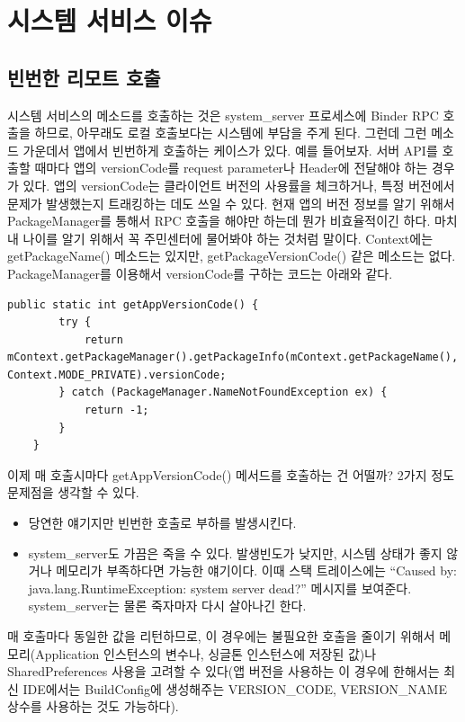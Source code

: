 \section{시스템 서비스 이슈}
\subsection{빈번한 리모트 호출}
시스템 서비스의 메소드를 호출하는 것은 system\_server 프로세스에 Binder RPC 호출을 하므로, 아무래도 로컬 호출보다는 시스템에 부담을 주게 된다.
그런데 그런 메소드 가운데서 앱에서 빈번하게 호출하는 케이스가 있다.
예를 들어보자. 서버 API를 호출할 때마다 앱의 versionCode를 request parameter나 Header에 전달해야 하는 경우가 있다.  앱의 versionCode는  클라이언트 버전의 사용률을 체크하거나, 특정 버전에서 문제가 발생했는지 트래킹하는 데도 쓰일 수 있다.
현재 앱의 버전 정보를 알기 위해서 PackageManager를 통해서 RPC 호출을 해야만 하는데 뭔가 비효율적이긴 하다. 
마치 내 나이를 알기 위해서 꼭 주민센터에 물어봐야 하는 것처럼 말이다. 
Context에는 getPackageName() 메소드는 있지만, getPackageVersionCode() 같은 메소드는 없다.\\

PackageManager를 이용해서 versionCode를 구하는 코드는 아래와 같다.
\begin{lstlisting}[frame=single]
	public static int getAppVersionCode() {
		try {
			return mContext.getPackageManager().getPackageInfo(mContext.getPackageName(), Context.MODE_PRIVATE).versionCode;
		} catch (PackageManager.NameNotFoundException ex) {
			return -1;
		}
	}
\end{lstlisting}

이제 매 호출시마다 getAppVersionCode() 메서드를 호출하는 건 어떨까?
2가지 정도 문제점을 생각할 수 있다.
\begin{itemize}
\item 당연한 얘기지만 빈번한 호출로 부하를 발생시킨다.
\item system\_server도  가끔은 죽을 수 있다. 발생빈도가 낮지만, 시스템 상태가 좋지 않거나 메모리가 부족하다면 가능한 얘기이다. 이때 스택 트레이스에는 ``Caused by: java.lang.RuntimeException: system server dead?'' 메시지를 보여준다. system\_server는 물론 죽자마자 다시 살아나긴 한다.
\end{itemize}

매 호출마다 동일한 값을 리턴하므로, 이 경우에는 불필요한 호출을 줄이기 위해서 메모리(Application 인스턴스의 변수나, 싱글톤 인스턴스에 저장된 값)나 SharedPreferences 사용을 고려할 수 있다(앱 버전을 사용하는 이 경우에 한해서는 최신 IDE에서는 BuildConfig에 생성해주는 VERSION\_CODE, VERSION\_NAME 상수를 사용하는 것도 가능하다).\\

